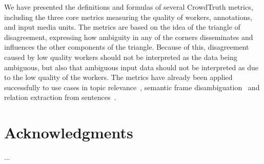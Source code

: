 We have presented the definitions and formulas of several CrowdTruth metrics, including the three core metrics measuring the quality of workers, annotations, and input media units. The metrics are based on the idea of the triangle of disagreement, expressing how ambiguity in any of the corners disseminates and influences the other components of the triangle. Because of this, disagreement caused by low quality workers should not be interpreted as the data being ambiguous, but also that ambiguous input data should not be interpreted as due to the low quality of the workers. The metrics have already been applied successfully to use cases in topic relevance~\cite{inel2018studying}, semantic frame disambiguation~\cite{dumitrache2018capturing} and relation extraction from sentences~\cite{dumitrache2017false}.

\section*{Acknowledgments}
...